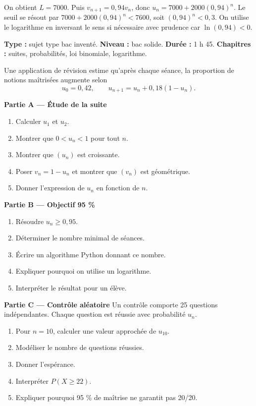 \documentclass[11pt,a4paper]{article}
\begin{document}
\begin{corrige}[M-LONG-01]
On obtient $L=7000$. Puis $v_{n+1}=0{,}94v_n$, donc $u_n=7000+2000(0{,}94)^n$. Le seuil se résout par $7000+2000(0{,}94)^n<7600$, soit $(0{,}94)^n<0{,}3$. On utilise le logarithme en inversant le sens si nécessaire avec prudence car $\ln(0{,}94)<0$.
\end{corrige}

\hypertarget{M-LONG-02}{}
\begin{sujettype}
\textbf{Type :} sujet type bac inventé.  
\textbf{Niveau :} bac solide.  
\textbf{Durée :} 1 h 45.  
\textbf{Chapitres :} suites, probabilités, loi binomiale, logarithme.

Une application de révision estime qu'après chaque séance, la proportion de notions maîtrisées augmente selon
\[
u_0=0{,}42,\qquad u_{n+1}=u_n+0{,}18(1-u_n).
\]

\textbf{Partie A — Étude de la suite}
\begin{enumerate}
  \item Calculer $u_1$ et $u_2$.
  \item Montrer que $0<u_n<1$ pour tout $n$.
  \item Montrer que $(u_n)$ est croissante.
  \item Poser $v_n=1-u_n$ et montrer que $(v_n)$ est géométrique.
  \item Donner l'expression de $u_n$ en fonction de $n$.
\end{enumerate}

\textbf{Partie B — Objectif 95 \%}
\begin{enumerate}
  \item Résoudre $u_n\geq0{,}95$.
  \item Déterminer le nombre minimal de séances.
  \item Écrire un algorithme Python donnant ce nombre.
  \item Expliquer pourquoi on utilise un logarithme.
  \item Interpréter le résultat pour un élève.
\end{enumerate}

\textbf{Partie C — Contrôle aléatoire}
Un contrôle comporte 25 questions indépendantes. Chaque question est réussie avec probabilité $u_n$.
\begin{enumerate}
  \item Pour $n=10$, calculer une valeur approchée de $u_{10}$.
  \item Modéliser le nombre de questions réussies.
  \item Donner l'espérance.
  \item Interpréter $P(X\geq22)$.
  \item Expliquer pourquoi 95 \% de maîtrise ne garantit pas 20/20.
\end{enumerate}
\end{sujettype}
\end{document}
